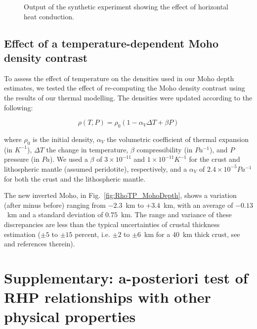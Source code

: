{\begin{subappendices}
\begin{figure}
	\begin{adjustbox}{center}
	\end{adjustbox}
	\caption{Output of the synthetic experiment showing the effect of horizontal heat conduction.}
	\label{fig:2Deff}
\end{figure}

\FloatBarrier

\subsection{Effect of a temperature-dependent Moho density contrast}
\label{ss:ApplSup:MethodTests:MohoDeltaRho}

To assess the effect of temperature on the densities used in our Moho depth estimates, we tested the effect of re-computing the Moho density contrast using the results of our thermal modelling.
The densities were updated according to the following:

\begin{equation*}
    \rho(T,P) = \rho_0 (1 - \alpha_V \Delta T + \beta P) 
\end{equation*}

where $\rho_0$ is the initial density, $\alpha_V$ the volumetric coefficient of thermal expansion (in $K^{-1}$), $\Delta T$ the change in temperature, $\beta$ compressibility (in $Pa^{-1}$), and $P$ pressure (in $Pa$). We used a $\beta$ of $3 \times 10^{-11}$ and $1 \times 10^{-11} K^{-1}$ for the crust and lithospheric mantle (assumed peridotite), respectively, and a $\alpha_V$ of $2.4 \times 10^{-5} Pa^{-1}$ for both the crust and the lithospheric mantle.

The new inverted Moho, in Fig.~\ref{fig:RhoTP_MohoDepth}, shows a variation (after minus before) ranging from $-2.3$~km to $+3.4$~km, with an average of $-0.13$~km and a standard deviation of $0.75$~km. The range and variance of these discrepancies are less than the typical uncertainties of crustal thickness estimation ($\pm 5$ to $\pm 15$ percent, i.e. $\pm 2$ to $\pm 6$~km for a $40$~km thick crust, see \cite{Grad2009} and references therein).


\section[Supplementary:~a-posteriori test of RHP relationships with other physical properties]{Supplementary: a-posteriori test of RHP relationships with other physical properties}
\label{s:ApplSup:Rel}


\end{subappendices}}
